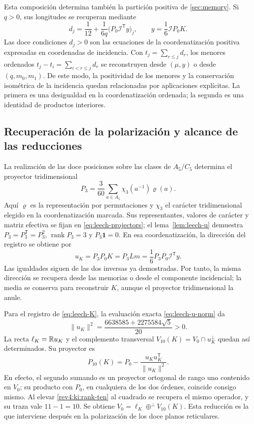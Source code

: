 Esta composición determina también la partición positiva de
\ref{sec:memory}. Si \(q>0\), sus longitudes se recuperan mediante
\begin{equation}
 d_j=\frac1{12}+\frac{1}{6q}
             \bigl(P_0\mathcal I^{\mathsf T}y\bigr)_j,
 \qquad y=\frac16\mathcal I P_0K.
 \label{rev4:ki:positive-lengths}
\end{equation}
Las doce condiciones \(d_j>0\) son las ecuaciones de la coordenatización
positiva expresadas en coordenadas de incidencia. Con
\(t_j=\sum_{r\leq j}d_r\), los menores ordenados
\(t_j-t_i=\sum_{i<r\leq j}d_r\) se reconstruyen desde
\((\mu,y)\) o desde \((q,m_0,m_1)\). De este modo, la
positividad de los menores y la conservación isométrica de la
incidencia quedan relacionadas por aplicaciones explícitas. La
primera es una desigualdad en la coordenatización ordenada; la segunda es una
identidad de productos interiores.

\subsection{Recuperación de la polarización y alcance de las reducciones}
\label{rev4:ki:direction-subsection}

La realización de las doce posiciones sobre las clases de
\(A_5/C_5\) determina el proyector tridimensional
\[
 P_3=\frac3{60}\sum_{a\in A_5}
               \chi_3(a^{-1})\varrho(a).
\]
Aquí \(\varrho\) es la representación por permutaciones y
\(\chi_3\) el carácter tridimensional elegido en la coordenatización
marcada. Sus representantes, valores de carácter y matriz efectiva
se fijan en \eqref{eq:leech-projectors}; el
lema~\ref{lem:leech-u} demuestra
\(P_3=P_3^{\mathsf T}=P_3^2\),
\(\operatorname{rank}P_3=3\) y \(P_3\mathbf1=0\).
En esa coordenatización, la dirección del registro se obtiene por
\begin{equation}
 u_K=P_3P_0K=P_3Lm
     =\frac16P_3P_0\mathcal I^{\mathsf T}y.
 \label{rev4:ki:direction-reconstruction}
\end{equation}
Las igualdades siguen de las dos inversas ya demostradas. Por tanto,
la misma dirección se recupera desde las memorias o desde el
componente incidencial; la media se conserva para reconstruir
\(K\), aunque el proyector tridimensional la anule.

Para el registro de \eqref{eq:leech-K}, la evaluación exacta
\eqref{eq:leech-u-norm} da
\[
 \|u_K\|^2=
       \frac{6638585+2275584\sqrt5}{20}>0.
\]
La recta \(\ell_K=\mathbb R u_K\) y el complemento transversal
\(V_{10}(K)=V_0\cap u_K^\perp\) quedan así determinados.
Su proyector es
\begin{equation}
 P_{10}(K)=P_0-
       \frac{u_Ku_K^{\mathsf T}}{\|u_K\|^2}.
 \label{rev4:ki:rank-ten}
\end{equation}
En efecto, el segundo sumando es un proyector ortogonal de rango uno
contenido en \(V_0\); su producto con \(P_0\), en cualquiera
de los dos órdenes, coincide consigo mismo. Al elevar
\eqref{rev4:ki:rank-ten} al cuadrado se recupera el mismo
operador, y su traza vale \(11-1=10\). Se obtiene
\(V_0=\ell_K\oplus^\perp V_{10}(K)\).
Esta reducción es la que interviene después en la polarización de
los doce planos reticulares.

